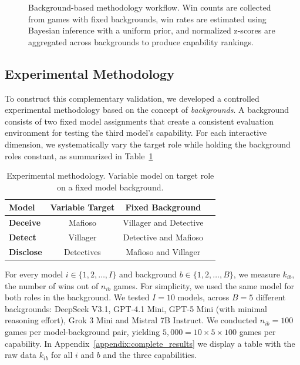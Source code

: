 \documentclass[sigconf]{aamas}
\begin{document}
\begin{figure}[t!]
    \centering
    \resizebox{\linewidth}{!}{}
    \caption{Background-based methodology workflow. Win counts are collected from games with fixed backgrounds, win rates are estimated using Bayesian inference with a uniform prior, and normalized z-scores are aggregated across backgrounds to produce capability rankings.}
    \label{fig:benchmark_background}
\end{figure}

\subsection{Experimental Methodology}
To construct this complementary validation, we developed a controlled experimental methodology based on the concept of \textit{backgrounds}. A background consists of two fixed model assignments that create a consistent evaluation environment for testing the third model's capability. For each interactive dimension, we systematically vary the target role while holding the background roles constant, as summarized in Table~\ref{tab:benchmark_methodology}


\begin{table}[t!]
    \centering
    \caption{Experimental methodology. Variable model on target role on a fixed model background.}
    \begin{tabular}{lccc}
        \toprule
        \textbf{Model} & \textbf{Variable Target} & \textbf{Fixed Background}  \\
        \midrule
        \textbf{Deceive} &  Mafioso & Villager and Detective \\
        \textbf{Detect} & Villager & Detective and Mafioso \\
        \textbf{Disclose} & Detectives & Mafioso and Villager \\
        \bottomrule
    \end{tabular}
    \label{tab:benchmark_methodology}
\end{table}

For every model $i\in\{1,2,\dots,I\}$ and background $b\in\{1,2,\dots, B\}$, we measure $k_{ib}$, the number of wins out of $n_{ib}$ games. For simplicity, we used the same model for both roles in the background. We tested $I=10$ models, across $B=5$ different backgrounds: DeepSeek V3.1, GPT-4.1 Mini, GPT-5 Mini (with minimal reasoning effort), Grok 3 Mini and Mistral 7B Instruct. We conducted $n_{ib}=100$ games per model-background pair, yielding $5{,}000=10\times 5\times 100$ games per capability. In Appendix~\ref{appendix:complete_results} we display a table with the raw data $k_{ib}$ for all $i$ and $b$ and the three capabilities.
\end{document}
